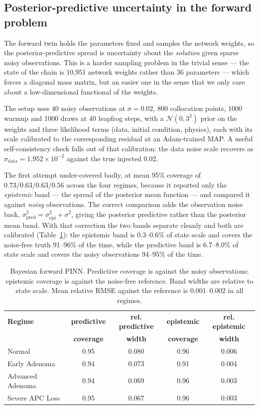 \documentclass[11pt]{article}
\begin{document}
\subsection{Posterior-predictive uncertainty in the forward problem}

The forward twin holds the parameters fixed and samples the network weights, so
the posterior-predictive spread is uncertainty about the \emph{solution} given
sparse noisy observations. This is a harder sampling problem in the trivial
sense --- the state of the chain is 10,951 network weights rather than 36
parameters --- which forces a diagonal mass matrix, but an easier one in the
sense that we only care about a low-dimensional functional of the weights.

The setup uses 40 noisy observations at $\sigma = 0.02$, 800 collocation
points, 1000 warmup and 1000 draws at 40 leapfrog steps, with a
$\mathcal{N}(0, 3^2)$ prior on the weights and three likelihood terms (data,
initial condition, physics), each with its scale calibrated to the
corresponding residual at an Adam-trained MAP. A useful self-consistency check
falls out of that calibration: the data noise scale recovers as
$\sigma_{\text{data}} = 1.952\times10^{-2}$ against the true injected
$0.02$.

The first attempt under-covered badly, at mean 95\% coverage of
$0.73/0.63/0.63/0.56$ across the four regimes, because it reported only the
\emph{epistemic} band --- the spread of the posterior mean function --- and
compared it against \emph{noisy} observations. The correct comparison adds the
observation noise back,
$\sigma_{\text{pred}}^2 = \sigma_{\text{epi}}^2 + \sigma^2$, giving the
posterior predictive rather than the posterior mean band. With that correction
the two bands separate cleanly and both are calibrated
(Table~\ref{tab:fwdbayes}): the epistemic band is 0.3--0.6\% of state scale and
covers the noise-free truth 91--96\% of the time, while the predictive band is
6.7--8.0\% of state scale and covers the noisy observations 94--95\% of the
time.

\begin{table}[H]
\centering
\small
\setlength{\tabcolsep}{5pt}
\begin{tabular}{lcccc}
\toprule
\textbf{Regime} & \textbf{predictive} & \textbf{rel. predictive} &
\textbf{epistemic} & \textbf{rel. epistemic} \\
& \textbf{coverage} & \textbf{width} & \textbf{coverage} & \textbf{width} \\
\midrule
Normal           & 0.95 & 0.080 & 0.96 & 0.006 \\
Early Adenoma    & 0.94 & 0.073 & 0.91 & 0.004 \\
Advanced Adenoma & 0.94 & 0.069 & 0.96 & 0.003 \\
Severe APC Loss  & 0.95 & 0.067 & 0.96 & 0.003 \\
\bottomrule
\end{tabular}
\caption{Bayesian forward PINN. Predictive coverage is against the noisy
observations; epistemic coverage is against the noise-free reference. Band
widths are relative to state scale. Mean relative RMSE against the reference is
0.001--0.002 in all regimes.}
\label{tab:fwdbayes}
\end{table}
\end{document}
